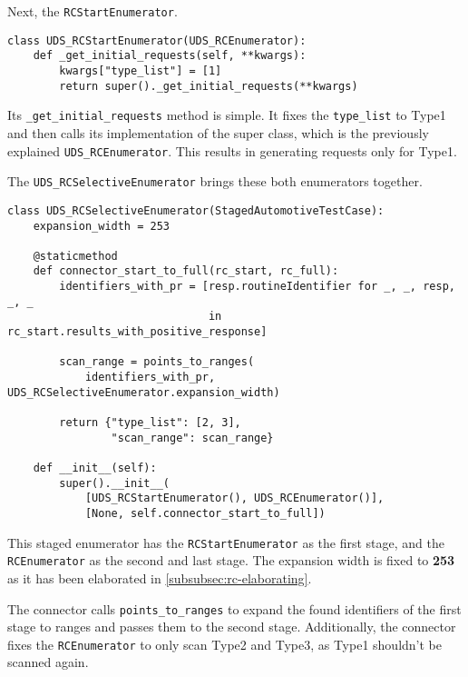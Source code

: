 Next, the \texttt{RCStartEnumerator}.

\begin{samepage}
\begin{verbatim}
class UDS_RCStartEnumerator(UDS_RCEnumerator):
    def _get_initial_requests(self, **kwargs):
        kwargs["type_list"] = [1]
        return super()._get_initial_requests(**kwargs)
\end{verbatim}
\end{samepage}

Its \texttt{_get_initial_requests} method is simple. It fixes the \texttt{type_list} to Type1 and then calls its implementation of the super class, which is the previously explained \texttt{UDS_RCEnumerator}. This results in generating requests only for Type1.

The \texttt{UDS_RCSelectiveEnumerator} brings these both enumerators together.

\begin{samepage}
\begin{verbatim}
class UDS_RCSelectiveEnumerator(StagedAutomotiveTestCase):
    expansion_width = 253

    @staticmethod
    def connector_start_to_full(rc_start, rc_full):
        identifiers_with_pr = [resp.routineIdentifier for _, _, resp, _, _
                               in rc_start.results_with_positive_response]

        scan_range = points_to_ranges(
            identifiers_with_pr, UDS_RCSelectiveEnumerator.expansion_width)

        return {"type_list": [2, 3],
                "scan_range": scan_range}

    def __init__(self):
        super().__init__(
            [UDS_RCStartEnumerator(), UDS_RCEnumerator()],
            [None, self.connector_start_to_full])
\end{verbatim}
\end{samepage}

This staged enumerator has the \texttt{RCStartEnumerator} as the first stage, and the \texttt{RCEnumerator} as the second and last stage.
The expansion width is fixed to \textbf{253} as it has been elaborated in \autoref{subsubsec:rc-elaborating}.

The connector calls \texttt{points_to_ranges} to expand the found identifiers of the first stage to ranges and passes them to the second stage. Additionally, the connector fixes the \texttt{RCEnumerator} to only scan Type2 and Type3, as Type1 shouldn't be scanned again.

